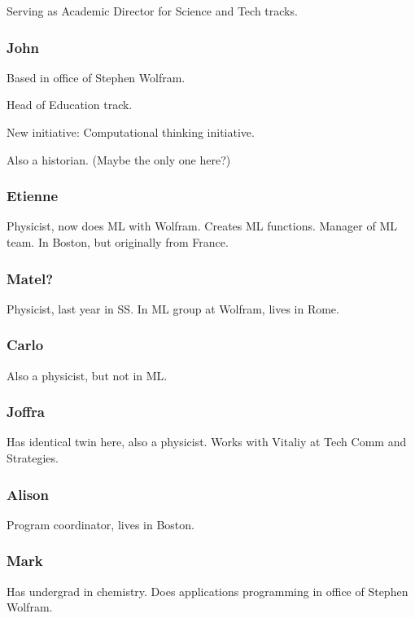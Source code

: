 \documentclass[11pt]{article}
\theoremstyle{definition}
\begin{document}
Serving as Academic Director for Science and Tech tracks.

\subsubsection{John}

Based in office of Stephen Wolfram.

Head of Education track. 

New initiative: Computational thinking initiative. 

Also a historian. (Maybe the only one here?)

\subsubsection{Etienne}

Physicist, now does ML with Wolfram. Creates ML functions. Manager of ML team. In Boston, but originally from France.

\subsubsection{Matel?}

Physicist, last year in SS. In ML group at Wolfram, lives in Rome. 

\subsubsection{Carlo}

Also a physicist, but not in ML.

\subsubsection{Joffra}

Has identical twin here, also a physicist. Works with Vitaliy at Tech Comm and Strategies. 

\subsubsection{Alison}

Program coordinator, lives in Boston. 

\subsubsection{Mark}

Has undergrad in chemistry. Does applications programming in office of Stephen Wolfram. 
\end{document}
